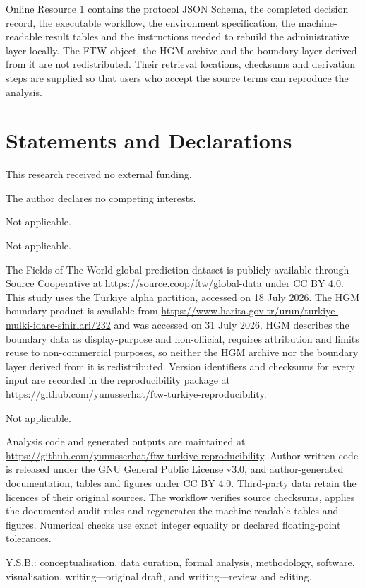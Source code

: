 \documentclass[pdflatex,sn-basic]{sn-jnl}
\begin{document}
\backmatter
\hypersetup{bookmarksdepth=4}

Online Resource 1 contains the protocol JSON Schema, the completed decision record, the executable workflow, the environment specification, the machine-readable result tables and the instructions needed to rebuild the administrative layer locally. The FTW object, the HGM archive and the boundary layer derived from it are not redistributed. Their retrieval locations, checksums and derivation steps are supplied so that users who accept the source terms can reproduce the analysis.

\section*{Statements and Declarations}

This research received no external funding.

The author declares no competing interests.

Not applicable.

Not applicable.

The Fields of The World global prediction dataset is publicly available through Source Cooperative at \url{https://source.coop/ftw/global-data} under CC BY 4.0. This study uses the Türkiye alpha partition, accessed on 18 July 2026. The HGM boundary product is available from \url{https://www.harita.gov.tr/urun/turkiye-mulki-idare-sinirlari/232} and was accessed on 31 July 2026. HGM describes the boundary data as display-purpose and non-official, requires attribution and limits reuse to non-commercial purposes, so neither the HGM archive nor the boundary layer derived from it is redistributed. Version identifiers and checksums for every input are recorded in the reproducibility package at \url{https://github.com/yunusserhat/ftw-turkiye-reproducibility}.

Not applicable.

Analysis code and generated outputs are maintained at \url{https://github.com/yunusserhat/ftw-turkiye-reproducibility}. Author-written code is released under the GNU General Public License v3.0, and author-generated documentation, tables and figures under CC BY 4.0. Third-party data retain the licences of their original sources. The workflow verifies source checksums, applies the documented audit rules and regenerates the machine-readable tables and figures. Numerical checks use exact integer equality or declared floating-point tolerances.

Y.S.B.: conceptualisation, data curation, formal analysis, methodology, software, visualisation, writing---original draft, and writing---review and editing.


\end{document}
